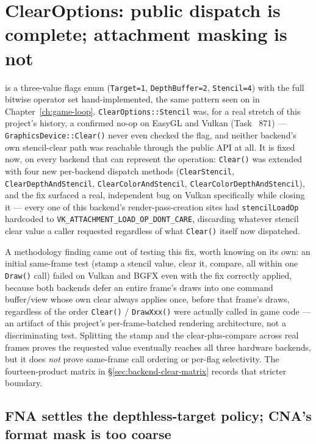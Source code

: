 \section{ClearOptions: public dispatch is complete; attachment masking is not}
\label{sec:clearoptions}

 is a three-value flags enum (\texttt{Target=1}, \texttt{DepthBuffer=2},
\texttt{Stencil=4}) with the full bitwise operator set hand-implemented, the same pattern seen
on  in Chapter~\ref{ch:game-loop}. \texttt{ClearOptions::Stencil}
was, for a real stretch of this project's history, a confirmed no-op on EasyGL and Vulkan (Task~%
871) --- \texttt{GraphicsDevice::Clear()} never even checked the flag, and neither backend's own
stencil-clear path was reachable through the public API at all. It is fixed now, on every
backend that can represent the operation: \texttt{Clear()} was extended with four new
per-backend dispatch methods (\texttt{ClearStencil}, \texttt{ClearDepthAndStencil},
\texttt{ClearColorAndStencil}, \texttt{ClearColorDepthAndStencil}), and the fix surfaced a real,
independent bug on Vulkan specifically while closing it --- every one of this backend's
render-pass-creation sites had \texttt{stencilLoadOp} hardcoded to
\texttt{VK\_ATTACHMENT\_LOAD\_OP\_DONT\_CARE}, discarding whatever stencil clear value a caller
requested regardless of what \texttt{Clear()} itself now dispatched.

A methodology finding came out of testing this fix, worth knowing on its own: an initial
same-frame test (stamp a stencil value, clear it, compare, all within one \texttt{Draw()} call)
failed on Vulkan and BGFX even with the fix correctly applied, because both backends defer an
entire frame's draws into one command buffer/view whose own clear always applies once, before
that frame's draws, regardless of the order \texttt{Clear()} / \texttt{DrawXxx()} were actually
called in game code --- an artifact of this project's per-frame-batched rendering architecture,
not a discriminating test. Splitting the stamp and the clear-plus-compare across real frames
proves the requested value eventually reaches all three hardware backends, but it does
\emph{not} prove same-frame call ordering or per-flag selectivity. The fourteen-product matrix
in \S\ref{sec:backend-clear-matrix} records that stricter boundary.

\subsection{FNA settles the depthless-target policy; CNA's format mask is too coarse}

